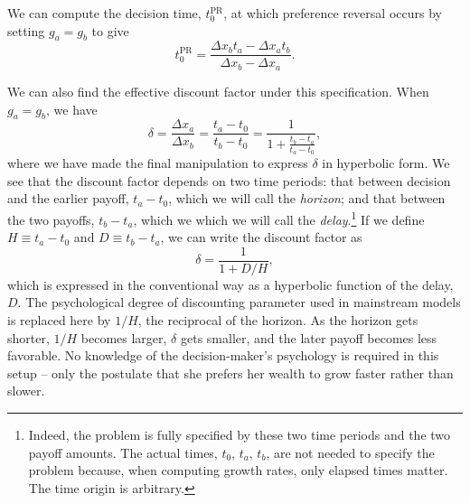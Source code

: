 \documentclass[11pt]{article}
\newcommand{\elabel}[1]{\label{eq:#1}}
\newcommand{\eref}[1]{Eq.~(\ref{eq:#1})}
\newcommand{\flabel}[1]{\label{fig:#1}}
\newcommand{\be}{\begin{equation}}
\newcommand{\ee}{\end{equation}}
\newcommand{\Dt}{\Delta t}
\newcommand{\Dx}{\Delta x}
\newcommand{\del}{D}
\newcommand{\hor}{H}
\numberwithin{equation}{section}
\begin{document}


We can compute the decision time, $t_0^\text{PR}$, at which preference reversal occurs by setting $g_a=g_b$ to give
\be
t_0^\text{PR} = \frac{\Dx_b t_a - \Dx_a t_b}{\Dx_b - \Dx_a}.
\elabel{t0PR}
\ee

We can also find the effective discount factor under this specification. When $g_a=g_b$, we have
\be
\delta = \frac{\Dx_a}{\Dx_b} = \frac{t_a-t_0}{t_b-t_0} = \frac{1}{1+\frac{t_b-t_a}{t_a-t_0}},
\ee
where we have made the final manipulation to express $\delta$ in hyperbolic form. We see that the discount factor depends on two time periods: that between decision and the earlier payoff, $t_a-t_0$, which we will call the \textit{horizon}; and that between the two payoffs, $t_b-t_a$, which we which we will call the \textit{delay}.\footnote{Indeed, the problem is fully specified by these two time periods and the two payoff amounts. The actual times, $t_0$, $t_a$, $t_b$, are not needed to specify the problem because, when computing growth rates, only elapsed times matter. The time origin is arbitrary.} If we define $\hor\equiv t_a-t_0$ and $\del\equiv t_b-t_a$, we can write the discount factor as
\be
\delta = \frac{1}{1+\del/\hor},
\ee
which is expressed in the conventional way as a hyperbolic function of the delay, $\del$. The psychological degree of discounting parameter used in mainstream models is replaced here by $1/\hor$, the reciprocal of the horizon. As the horizon gets shorter, $1/\hor$ becomes larger, $\delta$ gets smaller, and the later payoff becomes less favorable. No knowledge of the decision-maker's psychology is required in this setup -- only the postulate that she prefers her wealth to grow faster rather than slower.
\end{document}
